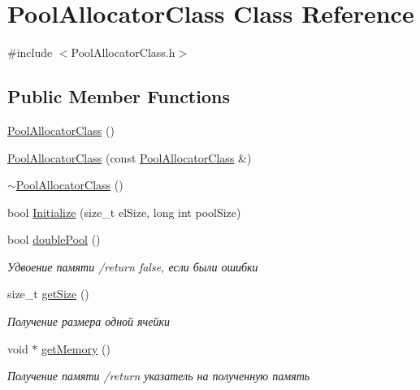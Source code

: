 \hypertarget{class_pool_allocator_class}{}\section{Pool\+Allocator\+Class Class Reference}
\label{class_pool_allocator_class}


{\ttfamily \#include $<$Pool\+Allocator\+Class.\+h$>$}

\subsection*{Public Member Functions}
\begin{DoxyCompactItemize}
\item 
\hyperlink{class_pool_allocator_class_a0d88676fe334e09d7889b5ec98022196}{Pool\+Allocator\+Class} ()
\item 
\hyperlink{class_pool_allocator_class_a267bcf4a629d52ad40ea4b638875e610}{Pool\+Allocator\+Class} (const \hyperlink{class_pool_allocator_class}{Pool\+Allocator\+Class} \&)
\item 
\hyperlink{class_pool_allocator_class_a425d6509ddee4683a934edd5ea259dc8}{$\sim$\+Pool\+Allocator\+Class} ()
\item 
bool \hyperlink{class_pool_allocator_class_a3f6694a151198bc92133716332cd1779}{Initialize} (size\+\_\+t el\+Size, long int pool\+Size)
\item 
bool \hyperlink{class_pool_allocator_class_ab977725840a7cffd71aed8ed87358635}{double\+Pool} ()
\begin{DoxyCompactList}\small\item\em Удвоение памяти /return false, если были ошибки \end{DoxyCompactList}\item 
size\+\_\+t \hyperlink{class_pool_allocator_class_ae04f13effd4cab7567169f28082327c7}{get\+Size} ()
\begin{DoxyCompactList}\small\item\em Получение размера одной ячейки \end{DoxyCompactList}\item 
void $\ast$ \hyperlink{class_pool_allocator_class_a048c4423ea1c882805d2215560d72b6d}{get\+Memory} ()
\begin{DoxyCompactList}\small\item\em Получение памяти /return указатель на полученную память \end{DoxyCompactList}\item 

\end{DoxyCompactItemize}
